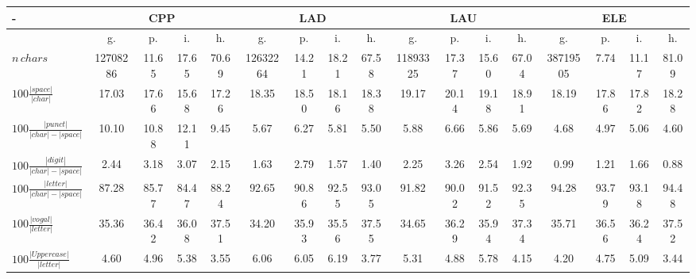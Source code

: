 \documentclass[%
 aip,
 jmp,%
 amsmath,amssymb,
 reprint,%
]{revtex4-1}
\begin{document}
\renewcommand{\arraystretch}{2}
\begin{table}
  \centering
    \small
\setlength{\tabcolsep}{.056667em}
  \begin{tabular}{|l|| c|c|c|c||  c|c|c|c||   c|c|c|c||   c|c|c|c|}\hline
-\-  & \multicolumn{4}{c|}{CPP} & \multicolumn{4}{c|}{LAD} & \multicolumn{4}{c|}{LAU} & \multicolumn{4}{c|}{ELE} \\ \hline
 & g. & p. & i. & h. &     g. & p. & i. & h. &    g. & p. & i. & h. &    g. & p. & i. & h. \\\hline
$n\,chars$  & 12708286 & 11.65 & 17.65 & 70.69 & 12632264 & 14.21 & 18.21 & 67.58 & 11893325 & 17.37 & 15.60 & 67.04 & 38719505 & 7.74 & 11.17 & 81.09 \\\hline
$100\frac{|space|}{|char|}$  & 17.03 & 17.66 & 15.68 & 17.26 & 18.35 & 18.50 & 18.16 & 18.38 & 19.17 & 20.14 & 19.18 & 18.91 & 18.19 & 17.86 & 17.82 & 18.28 \\\hline
$100\frac{|punct|}{|char|-|space|}$  & 10.10 & 10.88 & 12.11 & 9.45 & 5.67 & 6.27 & 5.81 & 5.50 & 5.88 & 6.66 & 5.86 & 5.69 & 4.68 & 4.97 & 5.06 & 4.60 \\\hline
$100\frac{|digit|}{|char|-|space|}$  & 2.44 & 3.18 & 3.07 & 2.15 & 1.63 & 2.79 & 1.57 & 1.40 & 2.25 & 3.26 & 2.54 & 1.92 & 0.99 & 1.21 & 1.66 & 0.88 \\\hline
$100\frac{|letter|}{|char|-|space|}$  & 87.28 & 85.77 & 84.47 & 88.24 & 92.65 & 90.86 & 92.55 & 93.05 & 91.82 & 90.02 & 91.52 & 92.35 & 94.28 & 93.79 & 93.18 & 94.48 \\\hline
$100\frac{|vogal|}{|letter|}$  & 35.36 & 36.42 & 36.08 & 37.51 & 34.20 & 35.93 & 35.56 & 37.55 & 34.65 & 36.29 & 35.94 & 37.34 & 35.71 & 36.56 & 36.24 & 37.52 \\\hline
$100\frac{|Uppercase|}{|letter|}$  & 4.60 & 4.96 & 5.38 & 3.55 & 6.06 & 6.05 & 6.19 & 3.77 & 5.31 & 4.88 & 5.78 & 4.15 & 4.20 & 4.75 & 5.09 & 3.44 \\\hline

\end{tabular}
\end{table}
\end{document}
